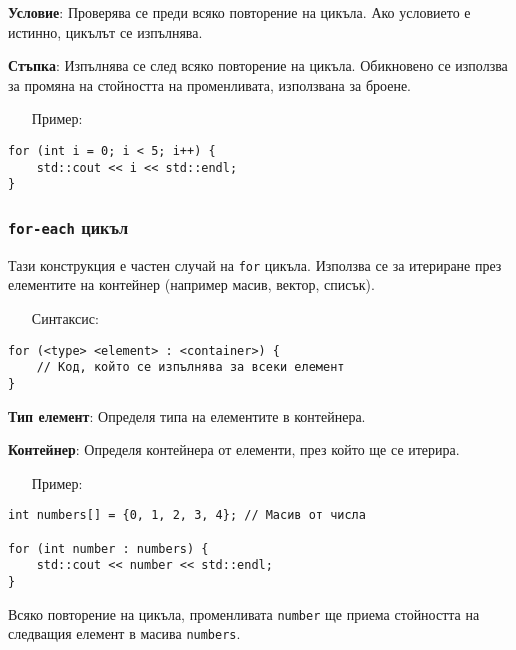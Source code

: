 \documentclass[oneside]{book}
\newcommand*{\code}[1]{\texttt{#1}}
\begin{document}
\textbf{Условие}: Проверява се преди всяко повторение на цикъла. Ако условието е истинно, цикълът се изпълнява.

\textbf{Стъпка}: Изпълнява се след всяко повторение на цикъла. Обикновено се използва за промяна на стойността на променливата, използвана за броене.
\pagebreak
\begin{itemize}\item[Пример:]\end{itemize}
\begin{mdframed}\begin{lstlisting}
for (int i = 0; i < 5; i++) {
    std::cout << i << std::endl;
}
\end{lstlisting}\end{mdframed}

\subsubsection{\code{for-each} цикъл}
Тази конструкция е частен случай на \code{for} цикъла. Използва се за итериране през елементите на контейнер (например масив, вектор, списък).

\begin{itemize}\item[Синтаксис:]\end{itemize}
\begin{mdframed}\begin{lstlisting}
for (<type> <element> : <container>) {
    // Код, който се изпълнява за всеки елемент
}
\end{lstlisting}\end{mdframed}

\textbf{Тип елемент}: Определя типа на елементите в контейнера.

\textbf{Контейнер}: Определя контейнера от елементи, през който ще се итерира.

\begin{itemize}\item[Пример:]\end{itemize}
\begin{mdframed}\begin{lstlisting}
int numbers[] = {0, 1, 2, 3, 4}; // Масив от числа

for (int number : numbers) {
    std::cout << number << std::endl;
}
\end{lstlisting}\end{mdframed}

Всяко повторение на цикъла, променливата \code{number} ще приема стойността на следващия елемент в масива \code{numbers}.
\end{document}
